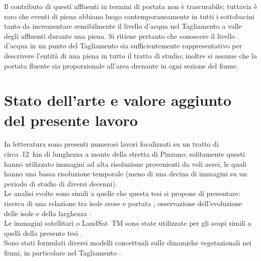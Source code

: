 %
Il contributo di questi affluenti in termini di portata non è trascurabile; tuttavia è raro che eventi di piena abbiano luogo contemporaneamente in tutti i sottobacini tanto da incrementare sensibilmente il livello d'acqua nel Tagliamento a valle degli affluenti durante una piena.
Si ritiene pertanto che conoscere il livello d'acqua in un punto del Tagliamento sia sufficientemente rappresentativo per descrivere l'entità di una piena in tutto il tratto di studio; inoltre si assume che la portata fluente sia proporzionale all'area drenante in ogni sezione del fiume.


\section{Stato dell'arte e valore aggiunto del presente lavoro}
In letteratura sono presenti numerosi lavori focalizzati su un tratto di circa~\SI{12}{\kilo\m} di lunghezza a monte della stretta di Pinzano; solitamente questi hanno utilizzato immagini ad alta risoluzione provenienti da voli aerei, le quali hanno una bassa risoluzione temporale (meno di una decina di immagini su un periodo di studio di diversi decenni).
\\
Le analisi svolte sono simili a quelle che questa tesi si propone di presentare: ricerca di una relazione tra isole erose e portata , osservazione dell'evoluzione delle isole e della larghezza .
\\
Le immagini satellitari \AST{} o LandSat~TM sono state utilizzate per gli scopi simili a quelli della presente tesi .
\\
Sono stati formulati diversi modelli concettuali sulle dinamiche vegetazionali nei fiumi, in particolare nel Tagliamento .


